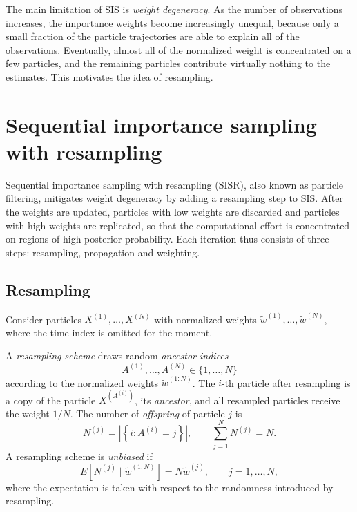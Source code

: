 The main limitation of SIS is \emph{weight degeneracy}. As the number of observations increases, the importance weights become increasingly unequal, because only a small fraction of the particle trajectories are able to explain all of the observations. Eventually, almost all of the normalized weight is concentrated on a few particles, and the remaining particles contribute virtually nothing to the estimates. This motivates the idea of resampling.

\section{Sequential importance sampling with resampling}
\label{sec:sequential_importance_sampling_with_resampling}
Sequential importance sampling with resampling (SISR), also known as particle filtering, mitigates weight degeneracy by adding a resampling step to SIS. After the weights are updated, particles with low weights are discarded and particles with high weights are replicated, so that the computational effort is concentrated on regions of high posterior probability. Each iteration thus consists of three steps: resampling, propagation and weighting.

\subsection{Resampling}
\label{sec:resampling}
Consider particles $X^{(1)},\ldots,X^{(N)}$ with normalized weights $\tilde{w}^{(1)},\ldots,\tilde{w}^{(N)}$, where the time index is omitted for the moment.

\begin{definition}
    \label{def:resampling}
    A \emph{resampling scheme} draws random \emph{ancestor indices}
    \begin{equation}
        A^{(1)},\ldots,A^{(N)} \in \{1,\ldots,N\}
    \end{equation}
    according to the normalized weights $\tilde{w}^{(1:N)}$. The $i$-th particle after resampling is a copy of the particle $X^{(A^{(i)})}$, its \emph{ancestor}, and all resampled particles receive the weight $1/N$. The number of \emph{offspring} of particle $j$ is
    \begin{equation}
        N^{(j)} = \left|\left\{i : A^{(i)} = j\right\}\right|, \qquad \sum_{j=1}^{N} N^{(j)} = N.
    \end{equation}
    A resampling scheme is \emph{unbiased} if
    \begin{equation}
        E\left[N^{(j)}\mid \tilde{w}^{(1:N)}\right] = N\tilde{w}^{(j)}, \qquad j=1,\ldots,N,
        \label{eq:unbiased_resampling}
    \end{equation}
    where the expectation is taken with respect to the randomness introduced by resampling.
\end{definition}

